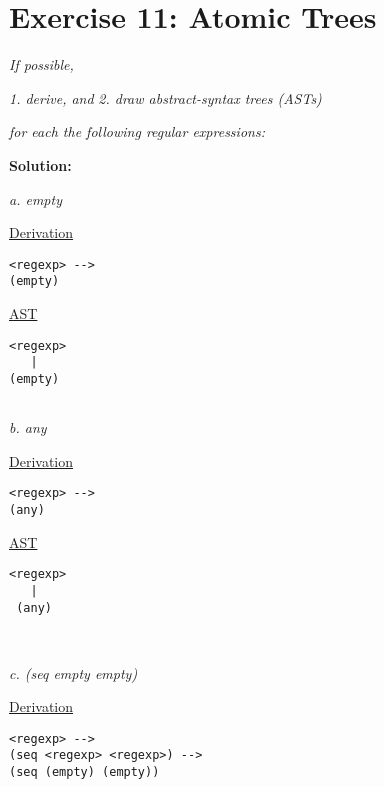\documentclass{article}
\begin{document}

\newpage

\section{Exercise 11: Atomic Trees}

\textit{If possible,}
\begin{quoting}
\textit{1. derive, and} \linebreak
\textit{2. draw abstract-syntax trees (ASTs)}
\end{quoting}
\textit{for each the following regular expressions:} \linebreak \linebreak

\noindent \textbf{Solution:} 

\begin{quoting}
\textit{a. empty}
\end{quoting}

\underline{Derivation}
\begin{lstlisting}[language=vasu]
<regexp> --> 
(empty)

\end{lstlisting}

\underline{AST}
\begin{lstlisting}[language=vasu]
<regexp>
   |
(empty)


\end{lstlisting}

\begin{quoting}
\textit{b. any}
\end{quoting}

\underline{Derivation}
\begin{lstlisting}[language=vasu]
<regexp> --> 
(any)

\end{lstlisting}

\underline{AST}
\begin{lstlisting}[language=vasu]
<regexp>
   |
 (any)
 
 
\end{lstlisting}

\begin{quoting}
\textit{c. (seq empty empty)}
\end{quoting}

\underline{Derivation}
\begin{lstlisting}[language=vasu]
<regexp> --> 
(seq <regexp> <regexp>) -->
(seq (empty) (empty))

\end{lstlisting}
\end{document}
